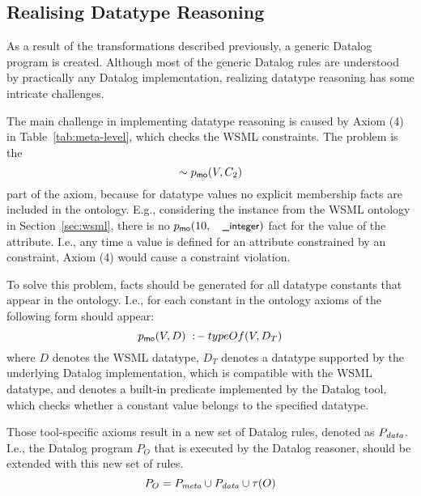 \def\dataaxioms{\ensuremath{P_{\smtxtit{data}}}\xspace}
\def\transdpred{\transtxt{dpred}}

\subsection{Realising Datatype Reasoning}
\label{sec:datatype_reasoning}
As a result
of the transformations described previously, a generic Datalog
program is created. Although most of the generic Datalog rules are understood by practically any
Datalog implementation, realizing datatype reasoning has some
intricate challenges.

The main challenge in implementing datatype reasoning is caused by Axiom (4) in Table~\ref{tab:meta-level}, which checks the WSML  constraints. The problem is the \[\sim p_{\mathrm{\sf mo}}(V,C_2)\] part of the axiom, because for datatype values no explicit membership facts are included in the ontology. E.g., considering the instance  from the WSML ontology in Section~\ref{sec:wsml}, there is no $\pmo(10,\syn{\_integer})$ fact for the value of the  attribute. I.e., any time a value is defined for an attribute constrained by an  constraint, Axiom (4) would cause a constraint violation.

To solve this problem, \pmo facts should be generated for all datatype constants that
appear in the ontology. I.e., for each
constant in the ontology axioms of the following form should
appear:
\begin{displaymath}
    p_{\mathrm{\sf mo}}(V,D) \;:\!-\: typeOf(V, D_T)
\end{displaymath} where $D$ denotes the WSML datatype, $D_T$ denotes a datatype supported by the underlying Datalog implementation, which is compatible with the WSML datatype, and \typeof denotes a built-in predicate implemented by the Datalog tool, which checks whether a constant value belongs to the specified datatype.

Those tool-specific axioms result in a new set of Datalog rules, denoted as \dataaxioms. 
I.e., the Datalog program $P_O$ that is executed by the Datalog reasoner, should be extended with this new set of rules. 
\begin{displaymath}
    P_O = \mlaxioms \cup \dataaxioms \cup \tau(O)
\end{displaymath}

